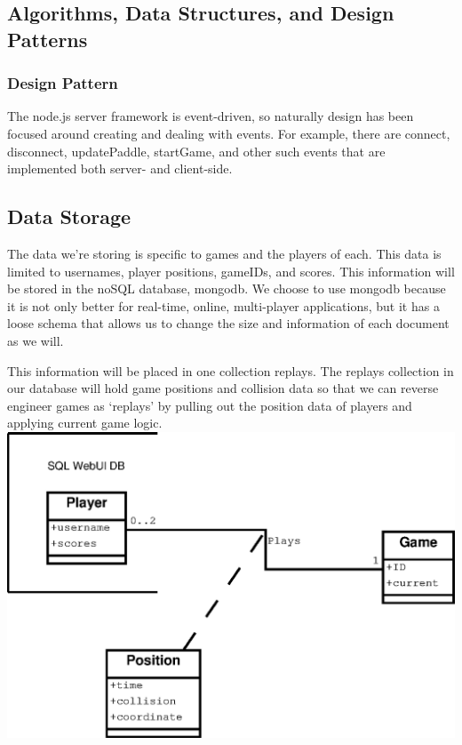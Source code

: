 \documentclass[letterpaper,12pt]{article}
\begin{document}
\subsection{Algorithms, Data Structures, and Design Patterns}
\subsubsection{Design Pattern}
The node.js server framework is event-driven, so naturally design has been focused around creating and dealing with events.
For example, there are connect, disconnect, updatePaddle, startGame, and other such events that are implemented both server- and client-side.

\subsection{Data Storage}
The data we’re storing is specific to games and the players of each. This data is limited to usernames, player positions, gameIDs, and scores. This information will be stored in the noSQL database, mongodb. We choose to use mongodb because it is not only better for real-time, online, multi-player applications, but it has a loose schema that allows us to change the size and information of each document as we will.

This information will be placed in one collection replays. The replays collection in our database will hold game positions and collision data so that we can reverse engineer games as ‘replays’ by pulling out the position data of players and applying current game logic. \\

\includegraphics{ERdia.eps} \\
\end{document}
